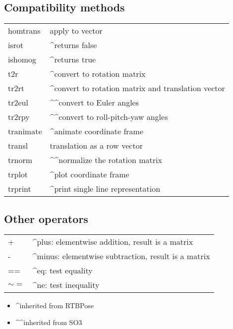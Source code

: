\subsection*{Compatibility methods}
\begin{longtable}{lp{120mm}}
homtrans & apply to vector\\ 
isrot & \textasciicircum returns false\\ 
ishomog & \textasciicircum returns true\\ 
t2r & \textasciicircum convert to rotation matrix\\ 
tr2rt & \textasciicircum convert to rotation matrix and translation vector\\ 
tr2eul & \textasciicircum\textasciicircum convert to Euler angles\\ 
tr2rpy & \textasciicircum\textasciicircum convert to roll-pitch-yaw angles\\ 
tranimate & \textasciicircum animate coordinate frame\\ 
transl & translation as a row vector\\ 
trnorm & \textasciicircum\textasciicircum normalize the rotation matrix\\ 
trplot & \textasciicircum plot coordinate frame\\ 
trprint & \textasciicircum print single line representation\\ 
\end{longtable}\vspace{1ex}

\subsection*{Other operators}
\begin{longtable}{lp{120mm}}
+ & \textasciicircum plus: elementwise addition, result is a matrix\\ 
- & \textasciicircum minus: elementwise subtraction, result is a matrix\\ 
== & \textasciicircum eq: test equality\\ 
$\sim=$ & \textasciicircum ne: test inequality\\ 
\end{longtable}\vspace{1ex}
\begin{itemize}
  \item \textasciicircum  inherited from RTBPose
  \item \textasciicircum\textasciicircum  inherited from SO3
\end{itemize}

